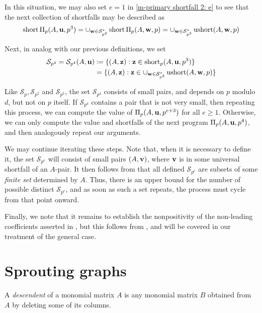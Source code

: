 \documentclass[11pt]{amsart}
\newcommand{\short}{\operatorname{short}}
\newcommand{\ushort}{\operatorname{ushort}}
\newcommand{\denom}{d}
\renewcommand{\S}{\mathcal{S}}
\begin{document}
In this situation, we may also set $e=1$ in \eqref{m-primary shortfall 2: e} to see that the next collection of shortfalls may be described as 
%
\[\short \IP_p(A,\vv{u},p^3) = \cup_{\vv{w} \in \S_{p^2}^{\ast}} \short \IP_p(A,\vv{w},p) = \cup_{\vv{w} \in \S_{p^3}^{\ast}} \ushort(A,\vv{w},p) \]  

Next, in analog with our previous definitions, we set %
\begin{align*}
\S_{p^4} = \S_{p^4}(A,\vv{u}) & \coloneqq \{ (A,\vv{z}):  \vv{z} \in \short_p(A,\vv{u},p^3) \} \\
 & = \{ (A,\vv{z}): \vv{z} \in \cup_{\vv{w} \in \S_{p^3}^{\ast}} \ushort(A,\vv{w},p) \} 
 \end{align*}
%

Like $\S_p,\S_{p^2}$ and $\S_{p^3}$, the set $\S_{p^4}$ consists of small pairs, and depends on $p$ modulo $\denom$, but not on $p$ itself. If $\S_{p^4}$ contains a pair that is not very small, then repeating this process, we can compute the value of $\Pi_p(A,\mathbf{u},p^{e+3})$ for all $e \geq 1$.  Otherwise, we can only compute the value and shortfalls of the next program $\Pi_p(A,\mathbf{u},p^{4})$, and then analogously repeat our arguments.

We may continue iterating these steps.  Note that, when it is necessary to define it, the set $\S_{p^e}$ will consist of small pairs $(A,\mathbf{v})$, where $\mathbf{v}$ is in some universal shortfall of an $A$-pair.  It then follows from  that all defined $\S_{p^e}$ are subsets of some \emph{finite set} determined by $A$.  Thus, there is an upper bound for the number of possible distinct  $\S_{p^e}$, and as soon as such a set repeats, the process must cycle from that point onward.

Finally, we note that it remains to establish the nonpositivity of the non-leading coefficients asserted in , but this follows from  , and will be covered in our treatment of the general case.




\newpage
\section{Sprouting graphs} \label{sprouting: S}

\begin{definition}
A \emph{descendent} of a monomial matrix $A$ is any monomial matrix $B$ obtained from $A$ by deleting some of its columns.
\end{definition}
\end{document}
